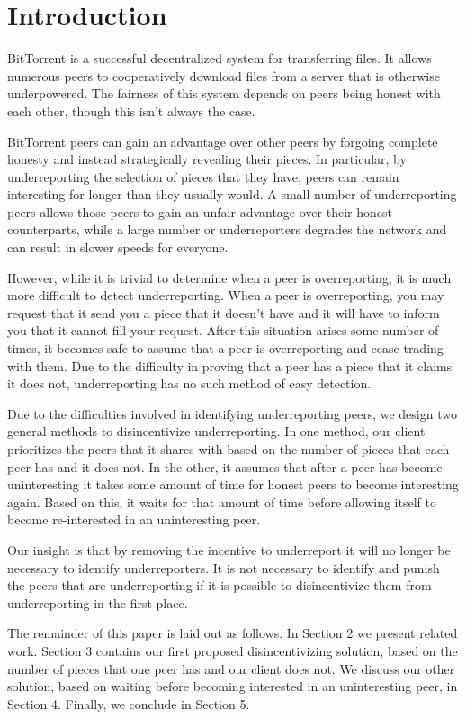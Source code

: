 \section{Introduction}

BitTorrent is a successful decentralized system for transferring files. It allows numerous peers to cooperatively download files from a server that is otherwise underpowered. The fairness of this system depends on peers being honest with each other, though this isn't always the case.

BitTorrent peers can gain an advantage over other peers by forgoing complete honesty and instead strategically revealing their pieces. In particular, by underreporting the selection of pieces that they have, peers can remain interesting for longer than they usually would. A small number of underreporting peers allows those peers to gain an unfair advantage over their honest counterparts, while a large number or underreporters degrades the network and can result in slower speeds for everyone.

However, while it is trivial to determine when a peer is overreporting, it is much more difficult to detect underreporting. When a peer is overreporting, you may request that it send you a piece that it doesn't have and it will have to inform you that it cannot fill your request. After this situation arises some number of times, it becomes safe to assume that a peer is overreporting and cease trading with them. Due to the difficulty in proving that a peer has a piece that it claims it does not, underreporting has no such method of easy detection.

Due to the difficulties involved in identifying underreporting peers, we design two general methods to disincentivize underreporting. In one method, our client prioritizes the peers that it shares with based on the number of pieces that each peer has and it does not. In the other, it assumes that after a peer has become uninteresting it takes some amount of time for honest peers to become interesting again. Based on this, it waits for that amount of time before allowing itself to become re-interested in an uninteresting peer.

Our insight is that by removing the incentive to underreport it will no longer be necessary to identify underreporters. It is not necessary to identify and punish the peers that are underreporting if it is possible to disincentivize them from underreporting in the first place.

The remainder of this paper is laid out as follows. In Section 2 we present related work. Section 3 contains our first proposed disincentivizing solution, based on the number of pieces that one peer has and our client does not. We discuss our other solution, based on waiting before becoming interested in an uninteresting peer, in Section 4. Finally, we conclude in Section 5.

